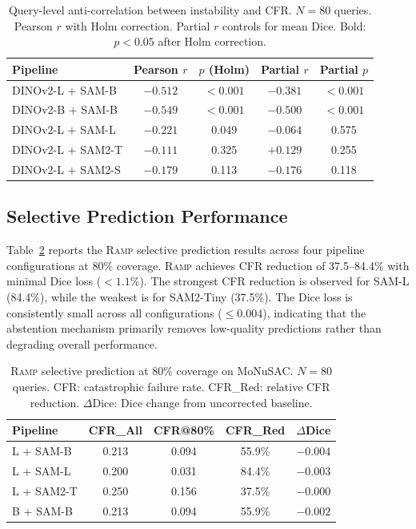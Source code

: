 \documentclass[11pt]{article}
\newcommand{\RAMP}{\textsc{Ramp}}
\begin{document}
\begin{table}[t]
\centering
\caption{Query-level anti-correlation between instability and CFR.
  $N=80$ queries. Pearson $r$ with Holm correction. Partial $r$ controls
  for mean Dice. Bold: $p < 0.05$ after Holm correction.}
\label{tab:anticorr}
\begin{tabular}{lcccc}
\toprule
Pipeline & Pearson $r$ & $p$ (Holm) & Partial $r$ & Partial $p$ \\
\midrule
DINOv2-L + SAM-B  & \textbf{$-0.512$} & $<0.001$ & $-0.381$ & $<0.001$ \\
DINOv2-B + SAM-B  & \textbf{$-0.549$} & $<0.001$ & $-0.500$ & $<0.001$ \\
DINOv2-L + SAM-L  & $-0.221$ & 0.049 & $-0.064$ & 0.575 \\
DINOv2-L + SAM2-T & $-0.111$ & 0.325 & $+0.129$ & 0.255 \\
DINOv2-L + SAM2-S & $-0.179$ & 0.113 & $-0.176$ & 0.118 \\
\bottomrule
\end{tabular}
\end{table}

\subsection{Selective Prediction Performance}

Table~\ref{tab:ramp} reports the \RAMP{} selective prediction results across
four pipeline configurations at 80\% coverage. \RAMP{} achieves CFR
reduction of 37.5--84.4\% with minimal Dice loss ($<1.1\%$). The strongest
CFR reduction is observed for SAM-L (84.4\%), while the weakest is for
SAM2-Tiny (37.5\%). The Dice loss is consistently small across all
configurations ($\leq 0.004$), indicating that the abstention mechanism
primarily removes low-quality predictions rather than degrading overall
performance.

\begin{table}[t]
\centering
\caption{\RAMP{} selective prediction at 80\% coverage on MoNuSAC.
  $N=80$ queries. CFR: catastrophic failure rate. CFR\_Red: relative
  CFR reduction. $\Delta$Dice: Dice change from uncorrected baseline.}
\label{tab:ramp}
\begin{tabular}{lcccc}
\toprule
Pipeline & CFR\_All & CFR@80\% & CFR\_Red & $\Delta$Dice \\
\midrule
L + SAM-B   & 0.213 & 0.094 & 55.9\% & $-0.004$ \\
L + SAM-L   & 0.200 & 0.031 & 84.4\% & $-0.003$ \\
L + SAM2-T  & 0.250 & 0.156 & 37.5\% & $-0.000$ \\
B + SAM-B   & 0.213 & 0.094 & 55.9\% & $-0.002$ \\
\bottomrule
\end{tabular}
\end{table}
\end{document}
